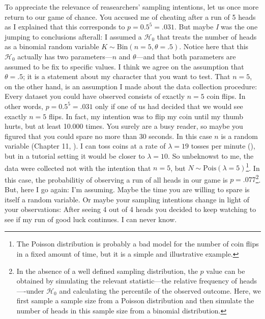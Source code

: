 \documentclass[
  man,
  floatsintext,
  longtable,
  nolmodern,
  notxfonts,
  notimes,
  colorlinks=true,linkcolor=blue,citecolor=blue,urlcolor=blue]{apa7}
\begin{document}
To appreciate the relevance of reasearchers' sampling intentions, let us
once more return to our game of chance. You accused me of cheating after
a run of 5 heads as I explained that this corresponds to
\(p = 0.5^5 = .031\). But maybe \emph{I} was the one jumping to
conclusions afterall: I assumed a \(\mathcal{H}_0\) that treats the
number of heads as a binomial random variable
\(K \sim \text{Bin}(n = 5, \theta = .5)\). Notice here that this
\(\mathcal{H}_0\) actually has two parameters---\(n\) and
\(\theta\)---and that both parameters are assumed to be fix to specific
values. I think we agree on the assumption that \(\theta = .5\); it is a
statement about my character that you want to test. That \(n = 5\), on
the other hand, is an assumption I made about the data collection
procedure: Every dataset you could have observed consists of exactly
\(n = 5\) coin flips. In other words, \(p = 0.5^5 = .031\) only if one
of us had decided that we would see exactly \(n = 5\) flips. In fact, my
intention was to flip my coin until my thumb hurts, but at least 10.000
times. You surely are a busy reader, so maybe you figured that you could
spare no more than 30 seconds. In this case \(n\) is a random variable
(Chapter 11, ). I can toss
coins at a rate of \(\lambda = 19\) tosses per minute
(), but in a tutorial
setting it would be closer to \(\lambda = 10\). So unbeknowst to me, the
data were collected not with the intention that \(n = 5\), but
\(N \sim \text{Pois}(\lambda = 5)\)\footnote{The Poisson distribution is
  probably a bad model for the number of coin flips in a fixed amount of
  time, but it is a simple and illustrative example.}. In this case, the
probabilitiy of observing a run of all heads in our game is
\(p = .077\)\footnote{In the absence of a well defined sampling
  distribution, the \(p\) value can be obtained by simulating the
  relevant statistic---the relative frequency of heads----under
  \(\mathcal{H}_0\) and calculating the percentile of the observed
  outcome. Here, we first sample a sample size from a Poisson
  distribution and then simulate the number of heads in this sample size
  from a binomial distribution.}. But, here I go again: I'm assuming.
Maybe the time you are willing to spare is itself a random variable. Or
maybe your sampling intentions change in light of your observations:
After seeing 4 out of 4 heads you decided to keep watching to see if my
run of good luck continues. I can never know.
\end{document}
